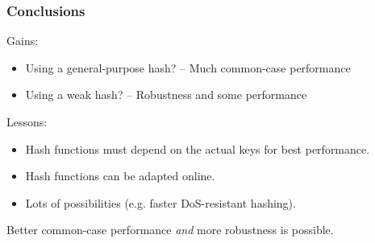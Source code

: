 \documentclass[onlytextwidth,usepdftitle=false]{beamer}
\newcommand\mglconclusion[1]{\textcolor{mglred2}{\textbf{\maltese} #1}}
\begin{document}
\begin{frame}
\frametitle{Conclusions}
Gains:
\begin{itemize}
\item Using a general-purpose hash? -- Much common-case performance
\item Using a weak hash? -- Robustness and some performance
\end{itemize}

Lessons:
\begin{itemize}
\item Hash functions must depend on the actual keys for best performance.
\item Hash functions can be adapted online.
\item Lots of possibilities (e.g. faster DoS-resistant hashing).
\end{itemize}
\mglconclusion{Better common-case performance \emph{and} more robustness is possible.}
\end{frame}
\end{document}
